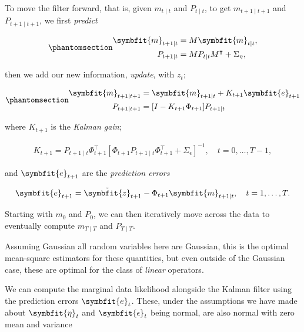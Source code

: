 \documentclass[
]{report}
\newcommand{\bv}[1]{\symbfit{#1}}
\theoremstyle{plain}
\theoremstyle{plain}
\theoremstyle{remark}
\begin{document}
To move the filter forward, that is, given \(m_{t\mid t}\) and
\(P_{t\mid t}\), to get \(m_{t+1\mid t+1}\) and \(P_{t+1\mid t+1}\), we
first \emph{predict}

\begin{equation}\phantomsection\label{eq-kalman-predict}{\begin{split}
\bv m_{t+1\mid t} &= M \bv m_{t\mid t},\\
P_{t+1\mid t} &= M P_{t\mid t} M^\intercal + \Sigma_\eta,
\end{split}
}\end{equation}

then we add our new information, \emph{update}, with \(z_{t}\);

\begin{equation}\phantomsection\label{eq-kalman-update}{\begin{split}
\bv m_{t+1\mid t+1} &= \bv m_{t+1\mid t} + K_{t+1} \bv e_{t+1}\\
P_{t+1\mid t+1} &= [I- K_{t+1}\Phi_{t+1}]P_{t+1\mid t}
\end{split} 
}\end{equation}

where \(K_{t+1}\) is the \emph{Kalman gain};

\[\begin{split}
K_{t+1} = P_{t+1\mid t}\Phi_{t+1}^\intercal [\Phi_{t+1} P_{t+1\mid t} \Phi_{t+1}^\intercal + \Sigma_\epsilon]^{-1}, \quad t=0,\dots,T-1,
\end{split}
\]

and \(\bv e_{t+1}\) are the \emph{prediction errors}

\[\begin{split}
\bv e_{t+1} = \tilde{\bv z}_{t+1}-\Phi_{t+1} \bv m_{t+1\mid t}, \quad t=1,\dots,T.
\end{split}
\]

Starting with \(m_0\) and \(P_0\), we can then iteratively move across
the data to eventually compute \(m_{T\mid T}\) and \(P_{T\mid T}\).

Assuming Gaussian all random variables here are Gaussian, this is the
optimal mean-square estimators for these quantities, but even outside of
the Gaussian case, these are optimal for the class of \emph{linear}
operators.

We can compute the marginal data likelihood alongside the Kalman filter
using the prediction errors \(\bv e_t\). These, under the assumptions we
have made about \(\bv \eta_t\) and \(\bv\epsilon_t\) being normal, are
also normal with zero mean and variance
\end{document}
